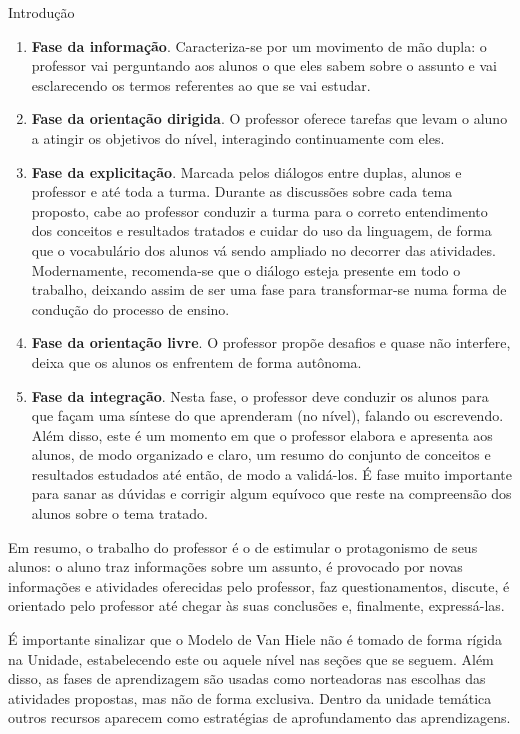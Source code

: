 \begin{apresentacao}{Introdução}
\begin{itemize}
\begin{enumerate}[label=\titem{\arabic*.}]
\item \textbf{Fase da informação}. Caracteriza-se por um movimento de mão dupla: o professor vai perguntando aos alunos o que eles sabem sobre o assunto e vai esclarecendo os termos referentes ao que se vai estudar.
\item \textbf{Fase da orientação dirigida}. O professor oferece tarefas que levam o aluno a atingir os objetivos do nível, interagindo continuamente com eles.
\item \textbf{Fase da explicitação}. Marcada pelos diálogos entre duplas, alunos e professor e até toda a turma. Durante as discussões sobre cada tema proposto, cabe ao professor conduzir a turma para o correto entendimento dos conceitos e resultados tratados e cuidar do uso da linguagem, de forma que o vocabulário dos alunos vá sendo ampliado no decorrer das atividades.  Modernamente, recomenda-se que o diálogo esteja presente em todo o trabalho, deixando assim de ser uma fase para transformar-se numa forma de condução do processo de ensino.
\item \textbf{Fase da orientação livre}. O professor propõe desafios e quase não interfere, deixa que os alunos os enfrentem de forma autônoma. 
\item \textbf{Fase da integração}. Nesta fase, o professor deve conduzir os alunos para que façam uma síntese do que aprenderam (no nível), falando ou escrevendo.  Além disso, este é um momento em que o professor elabora e apresenta aos alunos, de modo organizado e claro, um resumo do conjunto de conceitos e resultados estudados até então, de modo a validá-los. É fase muito importante para sanar as dúvidas e corrigir algum equívoco que reste na compreensão dos alunos sobre o tema tratado.  
\end{enumerate}

\end{itemize}
Em resumo, o trabalho do professor é o de estimular o protagonismo de seus alunos: o aluno traz informações sobre um assunto, é provocado por novas informações e atividades oferecidas pelo professor, faz questionamentos, discute, é orientado pelo professor até chegar às suas conclusões e, finalmente, expressá-las. 

É importante sinalizar que o Modelo de Van Hiele não é tomado de forma rígida na Unidade, estabelecendo este ou aquele nível nas seções que se seguem. Além disso, as fases de aprendizagem são usadas como norteadoras nas escolhas das atividades propostas, mas não de forma exclusiva. Dentro da unidade temática outros recursos aparecem como estratégias de aprofundamento das aprendizagens.


\end{apresentacao}
